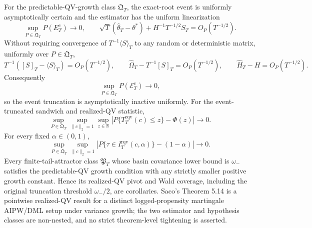For the predictable-QV-growth class \(\mathfrak Q_T\), the exact-root event is uniformly asymptotically certain and the estimator has the uniform linearization
\[
 \sup_{P\in\mathfrak Q_T}P(E_T^c)\longrightarrow0,
 \qquad
 \sqrt T(\widehat\theta_T-\theta^*)+H^{-1}T^{-1/2}S_T=O_P(T^{-1/2}).
\]
Without requiring convergence of \(T^{-1}\langle S\rangle_T\) to any random or deterministic matrix, uniformly over \(P\in\mathfrak Q_T\),
\[
 T^{-1}([S]_T-\langle S\rangle_T)=O_P(T^{-1/2}),\qquad
 \widehat\Omega_T-T^{-1}[S]_T=O_P(T^{-1/2}),\qquad
 \widehat H_T-H=O_P(T^{-1/2}).
\]
Consequently
\[
 \sup_{P\in\mathfrak Q_T}P(\mathcal E_T^c)\longrightarrow0,
\]
so the event truncation is asymptotically inactive uniformly. For the event-truncated sandwich and realized-QV statistic,
\[
 \sup_{P\in\mathfrak Q_T}\sup_{\|c\|_2=1}\sup_{z\in\mathbb R}
 \left|P\{T_T^{\mathrm{rqv}}(c)\le z\}-\Phi(z)\right|\longrightarrow0.
\]
For every fixed \(\alpha\in(0,1)\),
\[
 \sup_{P\in\mathfrak Q_T}\sup_{\|c\|_2=1}
 \left|P\{\tau\in I_T^{\mathrm{rqv}}(c,\alpha)\}-(1-\alpha)\right|
 \longrightarrow0.
\]
Every finite-tail-attractor class \(\mathfrak P_T\) whose basin covariance lower bound is \(\omega_-\) satisfies the predictable-QV growth condition with any strictly smaller positive growth constant. Hence its realized-QV pivot and Wald coverage, including the original truncation threshold \(\omega_-/2\), are corollaries. Saco's Theorem 5.14 is a pointwise realized-QV result for a distinct logged-propensity martingale AIPW/DML setup under variance growth; the two estimator and hypothesis classes are non-nested, and no strict theorem-level tightening is asserted.